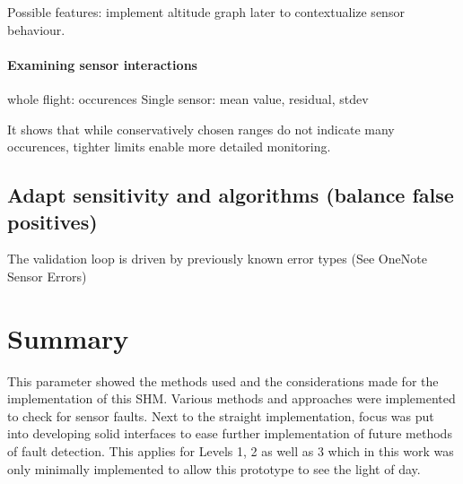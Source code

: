 Possible features: implement altitude graph later to contextualize sensor behaviour.

\paragraph{Examining sensor interactions}

whole flight: occurences Single sensor: mean value, residual, stdev




It shows that while conservatively chosen ranges do not indicate many occurences, tighter limits enable more detailed monitoring.

\subsection{Adapt sensitivity and algorithms (balance false positives)}

The validation loop is driven by previously known error types (See OneNote Sensor Errors)


\section{Summary}

This parameter showed the methods used and the considerations made for the implementation of this SHM. Various methods and approaches were implemented to check for sensor faults. Next to the straight implementation, focus was put into developing solid interfaces to ease further implementation of future methods of fault detection. This applies for Levels 1, 2 as well as 3 which in this work was only minimally implemented to allow this prototype to see the light of day.





